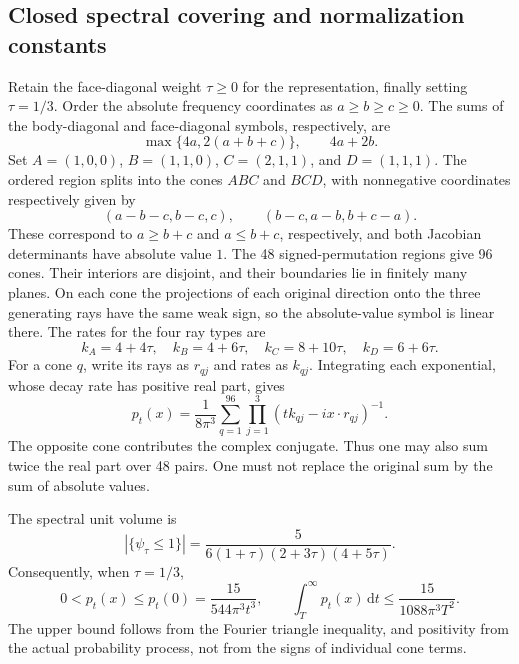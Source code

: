 \documentclass[11pt,a4paper]{article}
\theoremstyle{definition}\newtheorem{definition}[theorem]{Definition}
\theoremstyle{remark}\newtheorem{remark}[theorem]{Remark}
\newcommand{\dd}{\,\mathrm d}
\newcommand{\abs}[1]{\left|#1\right|}
\begin{document}
\subsection{Closed spectral covering and normalization constants}
Retain the face-diagonal weight $\tau\ge0$ for the representation, finally setting $\tau=1/3$. Order the absolute frequency coordinates as $a\ge b\ge c\ge0$. The sums of the body-diagonal and face-diagonal symbols, respectively, are
\[
 \max\{4a,2(a+b+c)\},\qquad4a+2b.
\]
Set $A=(1,0,0)$, $B=(1,1,0)$, $C=(2,1,1)$, and $D=(1,1,1)$. The ordered region splits into the cones $ABC$ and $BCD$, with nonnegative coordinates respectively given by
\[
 (a-b-c,b-c,c),\qquad(b-c,a-b,b+c-a).
\]
These correspond to $a\ge b+c$ and $a\le b+c$, respectively, and both Jacobian determinants have absolute value $1$. The 48 signed-permutation regions give 96 cones. Their interiors are disjoint, and their boundaries lie in finitely many planes. On each cone the projections of each original direction onto the three generating rays have the same weak sign, so the absolute-value symbol is linear there. The rates for the four ray types are
\begin{equation}\label{eq:rates}
 k_A=4+4\tau,\quad k_B=4+6\tau,\quad
 k_C=8+10\tau,\quad k_D=6+6\tau.
\end{equation}
For a cone $q$, write its rays as $r_{qj}$ and rates as $k_{qj}$. Integrating each exponential, whose decay rate has positive real part, gives
\begin{equation}\label{eq:heatcones}
 p_t(x)=\frac1{8\pi^3}\sum_{q=1}^{96}
 \prod_{j=1}^3(tk_{qj}-ix\cdot r_{qj})^{-1}.
\end{equation}
The opposite cone contributes the complex conjugate. Thus one may also sum twice the real part over 48 pairs. One must not replace the original sum by the sum of absolute values.

The spectral unit volume is
\[
 \abs{\{\psi_\tau\le1\}}=
 \frac5{6(1+\tau)(2+3\tau)(4+5\tau)}.
\]
Consequently, when $\tau=1/3$,
\begin{equation}\label{eq:peak}
 0<p_t(x)\le p_t(0)=\frac{15}{544\pi^3t^3},
 \qquad \int_T^\infty p_t(x)\dd t\le\frac{15}{1088\pi^3T^2}.
\end{equation}
The upper bound follows from the Fourier triangle inequality, and positivity from the actual probability process, not from the signs of individual cone terms.
\end{document}
